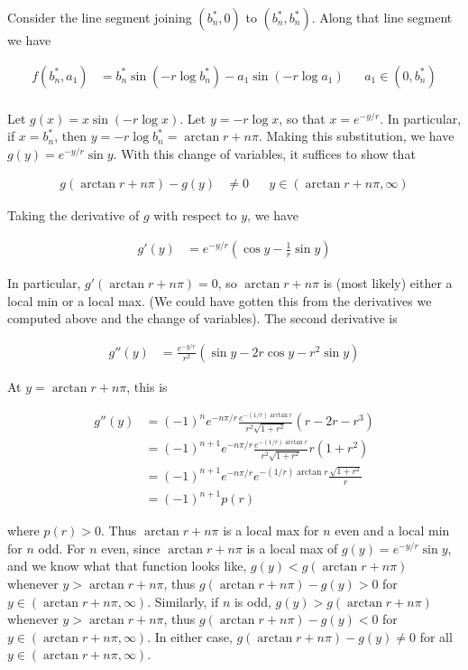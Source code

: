 \documentclass[12pt]{article}
\begin{document}
\begin{enumerate}
Consider the line segment joining $(b^*_n, 0)$ to $(b^*_n, b^*_n)$. Along that line segment we have 

\begin{align*}
f(b^*_n, a_1) &= b^*_n \sin(-r \log b^*_n) - a_1 \sin(-r \log a_1) && a_1 \in (0, b^*_n)\\
\end{align*}

Let $g(x) = x \sin(-r \log x)$. Let $y = -r \log x$, so that $x = e^{-y/r}$. In particular, if $x = b^*_n$, then $y = -r \log b^*_n = \arctan r + n \pi$. Making this substitution, we have $g(y) = e^{-y/r} \sin y$. With this change of variables, it suffices to show that

\begin{align*}
g(\arctan r + n \pi) - g(y) &\neq 0 && y \in (\arctan r + n \pi, \infty) 
\end{align*}

Taking the derivative of $g$ with respect to $y$, we have

\begin{align*}
g'(y) &= e^{-y/r}\left( \cos y - \frac{1}{r} \sin y \right)
\end{align*}

In particular, $g'(\arctan r + n \pi) = 0$, so $\arctan r + n \pi$ is (most likely) either a local min or a local max. (We could have gotten this from the derivatives we computed above and the change of variables). The second derivative is

\begin{align*}
g''(y) &= \frac{e^{-y/r}}{r^2} \left( \sin y - 2 r \cos y - r^2 \sin y \right)
\end{align*}

At $y = \arctan r + n \pi$, this is

\begin{align*}
g''(y) &= (-1)^n e^{-n \pi /r} \frac{e^{-(1/r)\arctan r}}{r^2 \sqrt{1+r^2}} \left( r - 2r - r^3 \right) \\
&= (-1)^{n+1} e^{-n \pi /r} \frac{e^{-(1/r)\arctan r}}{r^2 \sqrt{1+r^2}} r \left( 1 + r^2 \right) \\
&= (-1)^{n+1} e^{-n \pi /r} e^{-(1/r)\arctan r} \frac{ \sqrt{1 + r^2}}{r} \\
&= (-1)^{n+1} p(r)
\end{align*}

where $p(r) > 0$. Thus $\arctan r + n \pi$ is a local max for $n$ even and a local min for $n$ odd. For $n$ even, since $\arctan r + n \pi$ is a local max of $g(y) = e^{-y/r} \sin y$, and we know what that function looks like, $g(y) < g(\arctan r + n \pi)$ whenever $y > \arctan r + n \pi$, thus $g(\arctan r + n \pi) - g(y) > 0$ for $y \in (\arctan r + n \pi, \infty)$. Similarly, if $n$ is odd, $g(y) > g(\arctan r + n \pi)$ whenever $y > \arctan r + n \pi$, thus $g(\arctan r + n \pi) - g(y) < 0$ for $y \in (\arctan r + n \pi, \infty)$. In either case, $g(\arctan r + n \pi) - g(y) \neq 0$ for all $ y \in (\arctan r + n \pi, \infty)$.


\end{enumerate}
\end{document}
